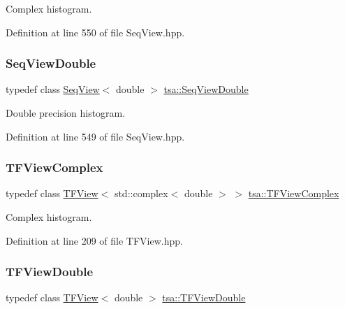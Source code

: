 Complex histogram. 



Definition at line 550 of file Seq\+View.\+hpp.

\mbox{\label{namespacetsa_ac599574bcc094eda25613724b8f3ca9e}} 
\subsubsection{\texorpdfstring{Seq\+View\+Double}{SeqViewDouble}}
{\footnotesize\ttfamily typedef class \hyperlink{classtsa_1_1_seq_view}{Seq\+View}$<$ double $>$ \hyperlink{namespacetsa_ac599574bcc094eda25613724b8f3ca9e}{tsa\+::\+Seq\+View\+Double}}



Double precision histogram. 



Definition at line 549 of file Seq\+View.\+hpp.

\mbox{\label{namespacetsa_ac27fece838548b661b9d7b73f36b61d5}} 
\subsubsection{\texorpdfstring{T\+F\+View\+Complex}{TFViewComplex}}
{\footnotesize\ttfamily typedef class \hyperlink{classtsa_1_1_t_f_view}{T\+F\+View}$<$ std\+::complex$<$ double $>$ $>$ \hyperlink{namespacetsa_ac27fece838548b661b9d7b73f36b61d5}{tsa\+::\+T\+F\+View\+Complex}}



Complex histogram. 



Definition at line 209 of file T\+F\+View.\+hpp.

\mbox{\label{namespacetsa_a0da725604861f3b1b20bbaa371e77d67}} 
\subsubsection{\texorpdfstring{T\+F\+View\+Double}{TFViewDouble}}
{\footnotesize\ttfamily typedef class \hyperlink{classtsa_1_1_t_f_view}{T\+F\+View}$<$ double $>$ \hyperlink{namespacetsa_a0da725604861f3b1b20bbaa371e77d67}{tsa\+::\+T\+F\+View\+Double}}




